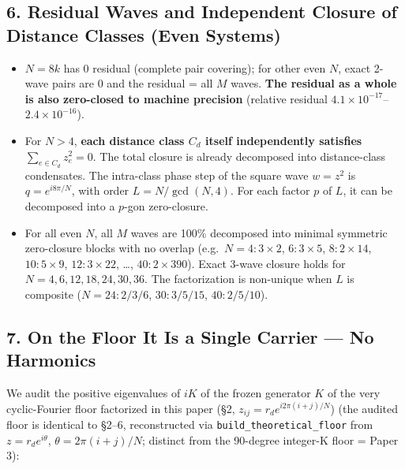 \documentclass[
  a4paper,
]{ltjsarticle}
\providecommand{\tightlist}{%
  \setlength{\itemsep}{0pt}\setlength{\parskip}{0pt}}
\begin{document}
\subsection{6. Residual Waves and Independent Closure of Distance
Classes (Even
Systems)}\label{residual-waves-and-independent-closure-of-distance-classes-even-systems}

\begin{itemize}
\tightlist
\item
  \(N=8k\) has 0 residual (complete pair covering); for other even
  \(N\), exact 2-wave pairs are 0 and the residual = all \(M\) waves.
  \textbf{The residual as a whole is also zero-closed to machine
  precision} (relative residual
  \(4.1\times10^{-17}\)--\(2.4\times10^{-16}\)).
\item
  For \(N>4\), \textbf{each distance class \(C_d\) itself independently
  satisfies \(\sum_{e\in C_d}z_e^2=0\)}. The total closure is already
  decomposed into distance-class condensates. The intra-class phase step
  of the square wave \(w=z^2\) is \(q=e^{i8\pi/N}\), with order
  \(L=N/\gcd(N,4)\). For each factor \(p\) of \(L\), it can be
  decomposed into a \(p\)-gon zero-closure.
\item
  For all even \(N\), all \(M\) waves are 100\% decomposed into minimal
  symmetric zero-closure blocks with no overlap
  (e.g.~\(N=4{:}3\times2\), \(6{:}3\times5\), \(8{:}2\times14\),
  \(10{:}5\times9\), \(12{:}3\times22\), \ldots, \(40{:}2\times390\)).
  Exact 3-wave closure holds for \(N=4,6,12,18,24,30,36\). The
  factorization is non-unique when \(L\) is composite (\(N=24{:}2/3/6\),
  \(30{:}3/5/15\), \(40{:}2/5/10\)).
\end{itemize}

\subsection{7. On the Floor It Is a Single Carrier --- No
Harmonics}\label{on-the-floor-it-is-a-single-carrier-no-harmonics}

We audit the positive eigenvalues of \(iK\) of the frozen generator
\(K\) of the very cyclic-Fourier floor factorized in this paper (§2,
\(z_{ij}=r_d e^{i2\pi(i+j)/N}\)) (the audited floor is identical to
§2--6, reconstructed via \texttt{build\_theoretical\_floor} from
\(z=r_d e^{i\theta}\), \(\theta=2\pi(i+j)/N\); distinct from the
90-degree integer-K floor = Paper 3):
\end{document}
